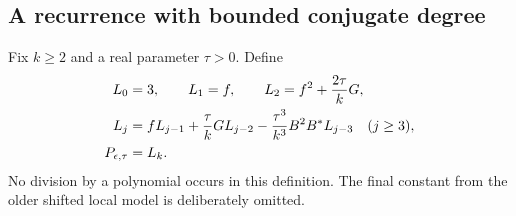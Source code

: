 \documentclass[UTF8,11pt]{ctexart}
\theoremstyle{definition}
\numberwithin{equation}{section}
\begin{document}
\subsection{A recurrence with bounded conjugate degree}

Fix $k\ge2$ and a real parameter $\tau>0$. Define
\begin{align}
 L_0&=3,\qquad L_1=f,\qquad L_2=f^2+\frac{2\tau}{k}G,\notag\\
 L_j&=fL_{j-1}+\frac{\tau}{k}GL_{j-2}
             -\frac{\tau^3}{k^3}B^2B^*L_{j-3}\quad(j\ge3),
                                      \label{v4:eq:globalrecurrence}\\
 P_{\epsilon,\tau}&=L_k.
                                      \label{v4:eq:globalfamily}
\end{align}
No division by a polynomial occurs in this definition. The final
constant from the older shifted local model is deliberately omitted.
\end{document}
